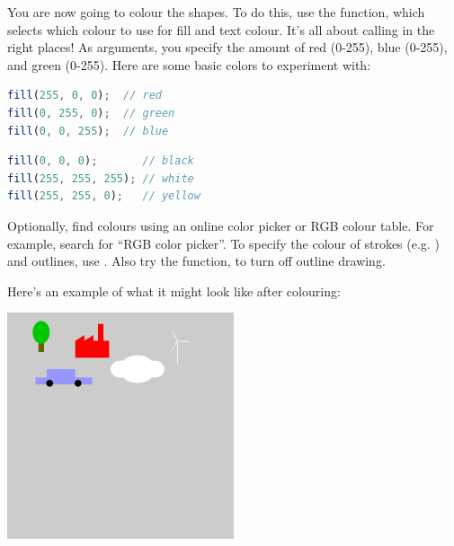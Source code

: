 \begin{exercisebox}[adjusted title=Colors]
You are now going to colour the shapes. To do this, use the
 function, which selects which colour 
to use for fill and text colour. It's all about calling
 in the right places! As arguments, you specify the amount
of red (0-255), blue (0-255), and green (0-255).
\noindent
Here are some basic colors to experiment with:
\begin{minipage}{0.45\linewidth}
\begin{lstlisting}[language=JavaScript]
fill(255, 0, 0);  // red
fill(0, 255, 0);  // green
fill(0, 0, 255);  // blue
\end{lstlisting}
\end{minipage}
\begin{minipage}{0.45\linewidth}
\begin{lstlisting}[language=JavaScript]
fill(0, 0, 0);       // black
fill(255, 255, 255); // white
fill(255, 255, 0);   // yellow
\end{lstlisting}
\end{minipage}

\noindent
Optionally, find colours using an online color picker or RGB
colour table. For example, search for ``RGB color picker''.
To specify the colour of strokes (e.g. ) and outlines, use . Also try the  function, to turn off outline drawing.
\end{exercisebox}

\begin{exercisebox}[adjusted title=Example]
\noindent
Here's an example of what it might look like after colouring:
\begin{center}
\includegraphics[width=0.5\textwidth]{illustrationer/farvelagt.png}
\end{center}
\end{exercisebox}

